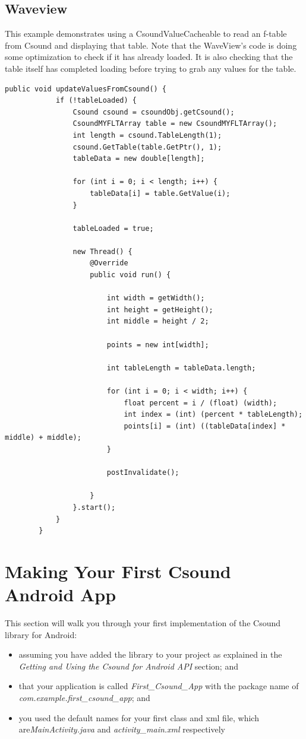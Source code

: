 \documentclass[11pt]{article}
\begin{document}
\subsection{Waveview}

This example demonstrates using a CsoundValueCacheable to read an f-table from Csound and displaying that table.  Note that the WaveView's code is doing some optimization to check if it has already loaded.  It is also checking that the table itself has completed loading before trying to grab any values for the table. 

\begin{lstlisting}[caption=Waveview code demonstrating reading f-tables from Csound]
		public void updateValuesFromCsound() {
			if (!tableLoaded) {
				Csound csound = csoundObj.getCsound();
				CsoundMYFLTArray table = new CsoundMYFLTArray();
				int length = csound.TableLength(1);
				csound.GetTable(table.GetPtr(), 1);
				tableData = new double[length];

				for (int i = 0; i < length; i++) {
					tableData[i] = table.GetValue(i);
				}

				tableLoaded = true;

				new Thread() {
					@Override
					public void run() {

						int width = getWidth();
						int height = getHeight();
						int middle = height / 2;

						points = new int[width];

						int tableLength = tableData.length;

						for (int i = 0; i < width; i++) {
							float percent = i / (float) (width);
							int index = (int) (percent * tableLength);
							points[i] = (int) ((tableData[index] * middle) + middle);
						}

						postInvalidate();

					}
				}.start();
			}
		}
\end{lstlisting}



\section{Making Your First Csound Android App }
This section will walk you through your first implementation of the Csound library for Android: 
\begin{itemize}
\item assuming you have added the library to your project as explained in the \textit{Getting and Using the Csound for Android API} section; and
\item  that your application is called \textit{First_Csound_App} with the package name of \textit{com.example.first_csound_app}; and
\item you used the default names for your first class and xml file, which are\textit{MainActivity.java}  and  \textit{activity_main.xml}  respectively
\end{itemize}
\end{document}
